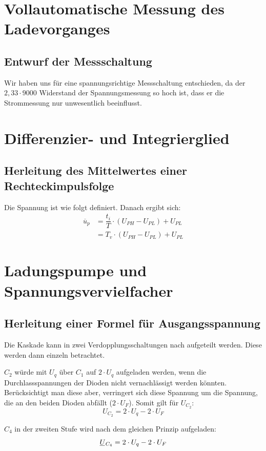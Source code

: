\documentclass[
12pt,
a4paper,
headings=small,                    %
bibliography=totoc,                %
listof=totoc,                      %
parskip=half*,                     %
]{scrartcl}                        %
\newcommand{\ul}[1]{\underline{#1\mkern-1.5mu}\mkern 1.5mu}
\newcommand{\laborsubsection}[2] {
    \renewcommand{\thesubsection}{#1 \thesection.\arabic{subsection}}
    \subsection{#2}
    \renewcommand{\thesubsection}{\thesection.\arabic{subsection}}
}
\begin{document}

%

\section{Vollautomatische Messung des Ladevorganges}
\laborsubsection{V}{Entwurf der Messschaltung}
Wir haben uns für eine spannungsrichtige Messschaltung entschieden, da der $ 2,33 \cdot 9000 $ Widerstand der Spannungsmessung so hoch ist, dass er die Strommessung nur unwesentlich beeinflusst.

\section{Differenzier- und Integrierglied}
\laborsubsection{V}{Herleitung des Mittelwertes einer Rechteckimpulsfolge}
Die Spannung ist wie folgt definiert. Danach ergibt sich:
\begin{align}
    \overline{u}_p & = \dfrac{t_{i}}{T} \cdot (U_{PH}-U_{PL}) + U_{PL} \\
                   & = T_{v} \cdot (U_{PH}-U_{PL}) + U_{PL}
\end{align}


\section{Ladungspumpe und Spannungsvervielfacher}
\laborsubsection{V}{Herleitung einer Formel für Ausgangsspannung}
Die Kaskade kann in zwei Verdopplungsschaltungen nach \autocite[42]{moeller} aufgeteilt werden. Diese werden dann einzeln betrachtet.

$C_2$ würde mit $U_q$ über $C_1$ auf $2\cdot U_{q}$ aufgeladen werden, wenn die Durchlassspannungen der Dioden nicht vernachlässigt werden könnten. Berücksichtigt man diese aber, verringert sich diese Spannung um die Spannung, die an den beiden Dioden abfällt ($ 2 \cdot U_{F} $). Somit gilt für $U_{C_2}$:
\begin{equation}
    U_{C_2} = 2 \cdot U_{q} - 2 \cdot U_{F}
\end{equation}

$C_4$ in der zweiten Stufe wird nach dem gleichen Prinzip aufgeladen:
\begin{equation}
    \ul{U}_{C_4} = 2 \cdot U_{q} - 2 \cdot U_{F}
\end{equation}
\end{document}
